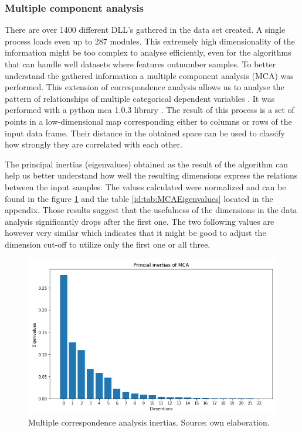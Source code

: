 \documentclass[a4paper,twoside,12pt]{book}
\begin{document}
\subsubsection{Multiple component analysis}

There are over 1400 different DLL's gathered in the data set created. A single process loads 
even up to 287 modules. This extremely high dimensionality of the information might be too complex 
to analyse efficiently, even for the algorithms that can handle well datasets where features 
outnumber samples. To better understand the gathered information a multiple component 
analysis (MCA) was performed. This extension of correspondence analysis allows us to analyse the 
pattern of relationships of multiple categorical dependent variables \cite{bib:mca}. It was performed 
with a python mca 1.0.3 library \cite{bib:pymca}. The result of this process is a set of points in a 
low-dimensional map corresponding either to columns or rows of the input data frame. Their 
distance in the obtained space can be used to classify how strongly they are correlated with 
each other. 

The principal inertias (eigenvalues) obtained as the result of the algorithm can help us better 
understand how well the resulting dimensions express the relations between the input samples. 
The values calculated were normalized and can be found in the figure \ref{fig:mcaInertias} and 
the table \ref{id:tab:MCAEigenvalues} located in the appendix. Those results suggest that the 
usefulness of the dimensions in the data analysis significantly drops after the first one. The two
following values are however very similar which indicates that it might be good to adjust the 
dimension cut-off to utilize only the first one or all three.


\begin{figure}
	\centering
	\includegraphics[scale=0.9]{images/MCAEigenvalues}
	\caption{Multiple correspondence analysis inertias. Source: own elaboration.}
	\label{fig:mcaInertias}
 \end{figure}
\end{document}
